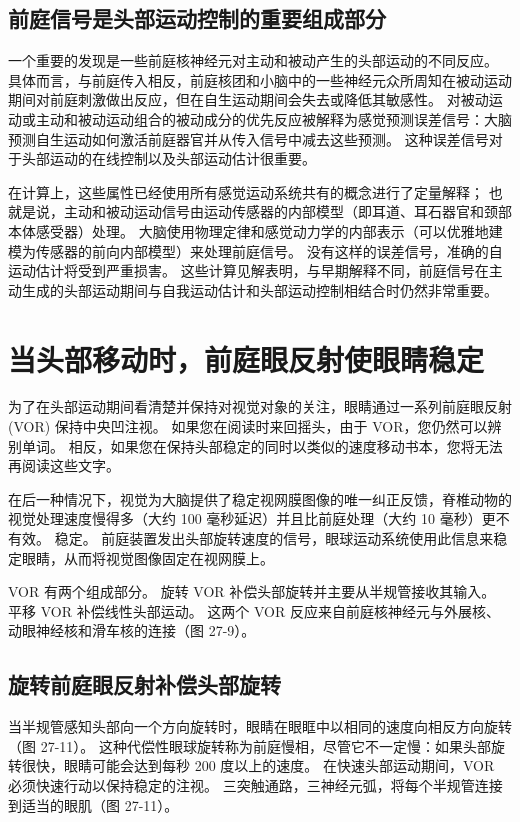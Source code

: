 \subsection{前庭信号是头部运动控制的重要组成部分}

一个重要的发现是一些前庭核神经元对主动和被动产生的头部运动的不同反应。 具体而言，与前庭传入相反，前庭核团和小脑中的一些神经元众所周知在被动运动期间对前庭刺激做出反应，但在自生运动期间会失去或降低其敏感性。 对被动运动或主动和被动运动组合的被动成分的优先反应被解释为感觉预测误差信号：大脑预测自生运动如何激活前庭器官并从传入信号中减去这些预测。 这种误差信号对于头部运动的在线控制以及头部运动估计很重要。

在计算上，这些属性已经使用所有感觉运动系统共有的概念进行了定量解释； 也就是说，主动和被动运动信号由运动传感器的内部模型（即耳道、耳石器官和颈部本体感受器）处理。 大脑使用物理定律和感觉动力学的内部表示（可以优雅地建模为传感器的前向内部模型）来处理前庭信号。 没有这样的误差信号，准确的自运动估计将受到严重损害。 这些计算见解表明，与早期解释不同，前庭信号在主动生成的头部运动期间与自我运动估计和头部运动控制相结合时仍然非常重要。

\section{当头部移动时，前庭眼反射使眼睛稳定}
为了在头部运动期间看清楚并保持对视觉对象的关注，眼睛通过一系列前庭眼反射 (VOR) 保持中央凹注视。 如果您在阅读时来回摇头，由于 VOR，您仍然可以辨别单词。 相反，如果您在保持头部稳定的同时以类似的速度移动书本，您将无法再阅读这些文字。

在后一种情况下，视觉为大脑提供了稳定视网膜图像的唯一纠正反馈，脊椎动物的视觉处理速度慢得多（大约 100 毫秒延迟）并且比前庭处理（大约 10 毫秒）更不有效。 稳定。 前庭装置发出头部旋转速度的信号，眼球运动系统使用此信息来稳定眼睛，从而将视觉图像固定在视网膜上。

VOR 有两个组成部分。 旋转 VOR 补偿头部旋转并主要从半规管接收其输入。 平移 VOR 补偿线性头部运动。 这两个 VOR 反应来自前庭核神经元与外展核、动眼神经核和滑车核的连接（图 27-9）。

\subsection{旋转前庭眼反射补偿头部旋转}
当半规管感知头部向一个方向旋转时，眼睛在眼眶中以相同的速度向相反方向旋转（图 27-11）。 这种代偿性眼球旋转称为前庭慢相，尽管它不一定慢：如果头部旋转很快，眼睛可能会达到每秒 200 度以上的速度。 在快速头部运动期间，VOR 必须快速行动以保持稳定的注视。 三突触通路，三神经元弧，将每个半规管连接到适当的眼肌（图 27-11）。

